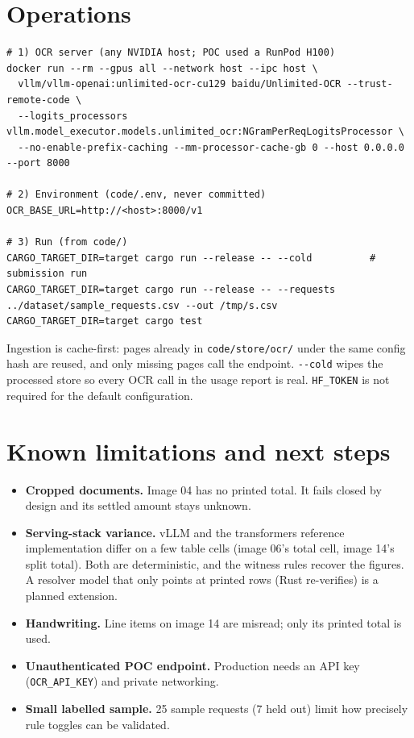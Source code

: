 \documentclass[11pt,a4paper]{article}
\begin{document}
\section{Operations}
\begin{lstlisting}
# 1) OCR server (any NVIDIA host; POC used a RunPod H100)
docker run --rm --gpus all --network host --ipc host \
  vllm/vllm-openai:unlimited-ocr-cu129 baidu/Unlimited-OCR --trust-remote-code \
  --logits_processors vllm.model_executor.models.unlimited_ocr:NGramPerReqLogitsProcessor \
  --no-enable-prefix-caching --mm-processor-cache-gb 0 --host 0.0.0.0 --port 8000

# 2) Environment (code/.env, never committed)
OCR_BASE_URL=http://<host>:8000/v1

# 3) Run (from code/)
CARGO_TARGET_DIR=target cargo run --release -- --cold          # submission run
CARGO_TARGET_DIR=target cargo run --release -- --requests ../dataset/sample_requests.csv --out /tmp/s.csv
CARGO_TARGET_DIR=target cargo test
\end{lstlisting}
Ingestion is cache-first: pages already in \texttt{code/store/ocr/} under the same config hash are reused, and only
missing pages call the endpoint. \texttt{-{}-cold} wipes the processed store so every OCR call in the usage report is real.
\texttt{HF\_TOKEN} is not required for the default configuration.

\section{Known limitations and next steps}
\begin{itemize}[leftmargin=*,itemsep=2pt]
  \item \textbf{Cropped documents.} Image 04 has no printed total. It fails closed by design and its settled amount stays unknown.
  \item \textbf{Serving-stack variance.} vLLM and the transformers reference implementation differ on a few table cells (image 06's
        total cell, image 14's split total). Both are deterministic, and the witness rules recover the figures.
        A resolver model that only points at printed rows (Rust re-verifies) is a planned extension.
  \item \textbf{Handwriting.} Line items on image 14 are misread; only its printed total is used.
  \item \textbf{Unauthenticated POC endpoint.} Production needs an API key (\texttt{OCR\_API\_KEY}) and private networking.
  \item \textbf{Small labelled sample.} 25 sample requests (7 held out) limit how precisely rule toggles can be validated.
\end{itemize}
\end{document}
